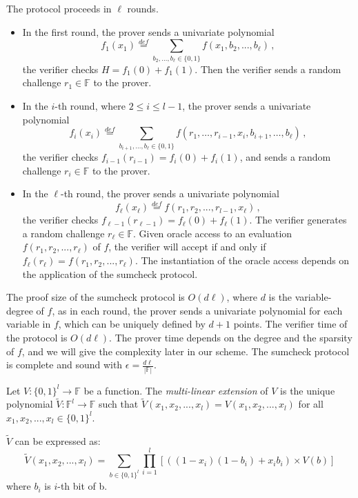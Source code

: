 \begin{protocol}
\label{prot::sumcheck}
	The protocol proceeds in $\ell$ rounds. 
	\begin{itemize}
		\item In the first round, the prover sends a univariate polynomial $$f_1(x_1)\overset{def}{=}\sum\limits_{b_2,\ldots,b_\ell\in\{0,1\}}f(x_1,b_2,...,b_\ell)\, ,$$ the verifier checks $H=f_1(0)+f_1(1)$. Then the verifier sends a random challenge $r_1\in\mathbb{F}$ to the prover.
		\item In the $i$-th round, where $2\le i \le l-1$, the prover sends a univariate polynomial
		$$f_{i}(x_{i})\overset{def}{=}\sum\limits_{b_{i+1},\ldots,b_\ell\in\{0,1\}}f(r_1,\ldots, r_{i-1}, x_{i}, b_{i+1},\ldots, b_{\ell})\, ,$$ 
		the verifier checks $f_{i-1}(r_{i-1})=f_{i}(0)+f_{i}(1)$, and sends a random challenge $r_{i}\in\mathbb{F}$ to the prover.
		\item In the $\ell$-th round, the prover sends a univariate polynomial $$f_{\ell}(x_{\ell})\overset{def}{=}f(r_1, r_2, ..., r_{l-1}, x_{\ell})\, ,$$ the verifier checks $f_{\ell-1}(r_{\ell-1})=f_{\ell}(0)+f_{\ell}(1)$. The verifier generates a random challenge $r_{\ell}\in\mathbb{F}$. Given oracle access to an evaluation $f(r_1, r_2, ..., r_\ell)$ of $f$, the verifier will accept if and only if $f_{\ell}(r_\ell) = f(r_1, r_2, ..., r_\ell)$. The instantiation of the oracle access depends on the application of the sumcheck protocol.
	\end{itemize}
\end{protocol}

The proof size of the sumcheck protocol is $O(d\ell)$, where $d$ is the variable-degree of $f$, as in each round, the prover sends a univariate polynomial for each variable in $f$, which can be uniquely defined by $d+1$ points. The verifier time of the protocol is $O(d\ell)$. The prover time depends on the degree and the sparsity of $f$, and we will give the complexity later in our scheme. The sumcheck protocol is complete and sound with $\epsilon = \frac{d\ell}{|\mathbb{F}|}$. 

\begin{definition}
	Let $V:\{0, 1\}^l \rightarrow \mathbb{F}$ be a function. The \textit{multi-linear extension} of $V$ is the unique polynomial $\tilde{V}: \mathbb{F}^l \rightarrow \mathbb{F}$ such that $\tilde{V}(x_1, x_2, ..., x_{l}) = V(x_1, x_2, ..., x_{l})$ for all $x_1, x_2, ..., x_{l}\in\{0,1\}^l$.
	
	
	$\tilde{V}$ can be expressed as:
	$$\tilde{V}(x_1, x_2, ..., x_{l})=\sum_{b\in\{0,1\}^l}\prod_{i=1}^{l}[((1-x_i)(1-b_i)+x_ib_i) \times V(b)]$$
	where $b_i$ is $i$-th bit of b.
	
	
\end{definition}



